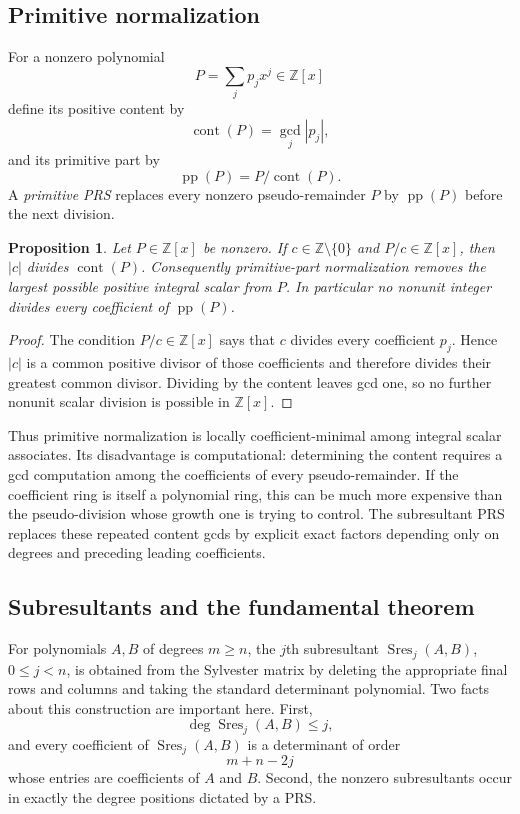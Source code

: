 \documentclass[11pt]{book}
\newtheorem{proposition}[theorem]{Proposition}
\theoremstyle{definition}
\newcommand{\ZZ}{\mathbb Z}
\begin{document}
\subsection{Primitive normalization}

For a nonzero polynomial
\[
 P=\sum_j p_jx^j\in\ZZ[x]
\]
define its positive content by
\[
 \operatorname{cont}(P)=\gcd_j|p_j|,
\]
and its primitive part by
\[
 \operatorname{pp}(P)=P/\operatorname{cont}(P).
\]
A \emph{primitive PRS} replaces every nonzero pseudo-remainder $P$ by
$\operatorname{pp}(P)$ before the next division.

\begin{proposition}\label{prop:primitive-prs-maximal-scalar}
Let $P\in\ZZ[x]$ be nonzero.  If $c\in\ZZ\setminus\{0\}$ and
$P/c\in\ZZ[x]$, then $|c|$ divides $\operatorname{cont}(P)$.  Consequently
primitive-part normalization removes the largest possible positive integral
scalar from $P$.  In particular no nonunit integer divides every coefficient
of $\operatorname{pp}(P)$.
\end{proposition}

\begin{proof}
The condition $P/c\in\ZZ[x]$ says that $c$ divides every coefficient $p_j$.
Hence $|c|$ is a common positive divisor of those coefficients and therefore
divides their greatest common divisor.  Dividing by the content leaves gcd
one, so no further nonunit scalar division is possible in $\ZZ[x]$.
\end{proof}

Thus primitive normalization is locally coefficient-minimal among integral
scalar associates.  Its disadvantage is computational: determining the
content requires a gcd computation among the coefficients of every
pseudo-remainder.  If the coefficient ring is itself a polynomial ring, this
can be much more expensive than the pseudo-division whose growth one is
trying to control.  The subresultant PRS replaces these repeated content gcds
by explicit exact factors depending only on degrees and preceding leading
coefficients.

\subsection{Subresultants and the fundamental theorem}

For polynomials $A,B$ of degrees $m\ge n$, the $j$th subresultant
$\operatorname{Sres}_j(A,B)$, $0\le j<n$, is obtained from the Sylvester
matrix by deleting the appropriate final rows and columns and taking the
standard determinant polynomial.  Two facts about this construction are
important here.  First,
\begin{equation}\label{eq:subresultant-determinant-order}
 \deg\operatorname{Sres}_j(A,B)\le j,
\end{equation}
and every coefficient of $\operatorname{Sres}_j(A,B)$ is a determinant of
order
\begin{equation}\label{eq:subresultant-order}
 m+n-2j
\end{equation}
whose entries are coefficients of $A$ and $B$.  Second, the nonzero
subresultants occur in exactly the degree positions dictated by a PRS.
\end{document}
